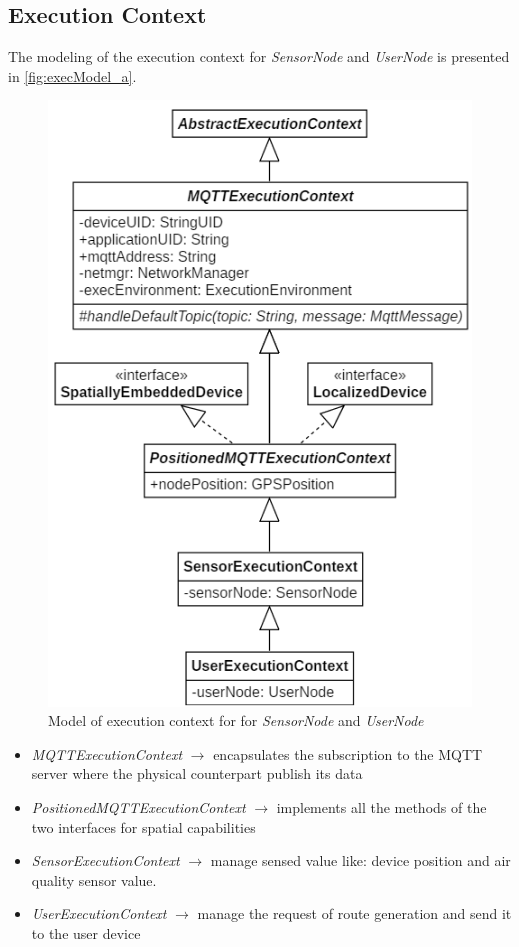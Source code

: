 \subsection{Execution Context}
The modeling of the execution context for \textit{SensorNode} and \textit{UserNode} is presented in \autoref{fig:execModel_a}.

\begin{figure}[h]
    \centering
    \includegraphics[scale=0.9]{images/execContextModel_v3a.png}
    \caption{Model of execution context for for \textit{SensorNode} and \textit{UserNode}}
    \label{fig:execModel_a}
\end{figure}

\begin{itemize}
    \item \textit{MQTTExecutionContext} $\rightarrow$ encapsulates the subscription to the MQTT server where the physical counterpart publish its data
    \item \textit{PositionedMQTTExecutionContext} $\rightarrow$ implements all the methods of the two interfaces for spatial capabilities
    \item \textit{SensorExecutionContext} $\rightarrow$ manage sensed value like: device position and air quality sensor value. 
    \item \textit{UserExecutionContext} $\rightarrow$ manage the request of route generation and send it to the user device
\end{itemize}

